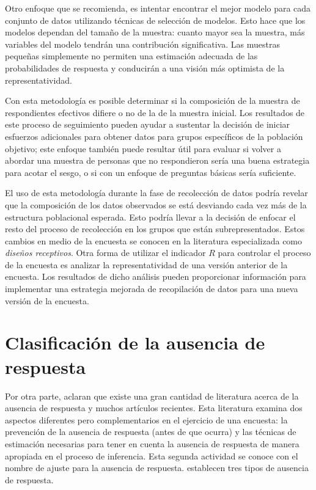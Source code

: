 \documentclass[
  12pt,
]{book}
\begin{document}
Otro enfoque que se recomienda, es intentar encontrar el mejor modelo para cada conjunto de datos utilizando técnicas de selección de modelos. Esto hace que los modelos dependan del tamaño de la muestra: cuanto
mayor sea la muestra, más variables del modelo tendrán una contribución significativa. Las muestras pequeñas simplemente no permiten una estimación adecuada de las probabilidades de respuesta y conducirán a una visión más optimista de la representatividad.

Con esta metodología es posible determinar si la composición de la muestra de respondientes efectivos difiere o no de la de la muestra inicial. Los resultados de este proceso de seguimiento pueden ayudar a sustentar
la decisión de iniciar esfuerzos adicionales para obtener datos para grupos específicos de la población objetivo; este enfoque también puede resultar útil para evaluar si volver a abordar una muestra de personas que no respondieron sería una buena estrategia para acotar el sesgo, o si con un enfoque de preguntas básicas sería suficiente.

El uso de esta metodología durante la fase de recolección de datos podría revelar que la composición de los datos observados se está desviando cada vez más de la estructura poblacional esperada. Esto podría llevar a la decisión de enfocar el resto del proceso de recolección en los grupos que están subrepresentados. Estos cambios en medio de la encuesta se conocen en la literatura especializada como \emph{diseños receptivos}. Otra forma de utilizar el indicador \(R\) para controlar el proceso de la encuesta es analizar la representatividad de una versión anterior de la encuesta. Los resultados de dicho análisis pueden proporcionar información para implementar una estrategia mejorada de recopilación de datos para una nueva versión de la encuesta.

\hypertarget{clasificaciuxf3n-de-la-ausencia-de-respuesta}{%
\section{Clasificación de la ausencia de respuesta}\label{clasificaciuxf3n-de-la-ausencia-de-respuesta}}

Por otra parte, \citet{Lund} aclaran que existe una gran cantidad de literatura acerca de la ausencia de respuesta y muchos artículos recientes. Esta literatura examina dos aspectos diferentes pero complementarios en el ejercicio de una encuesta: la prevención de la ausencia de respuesta (antes de que ocurra) y las técnicas de estimación necesarias para tener en cuenta la ausencia de respuesta de manera apropiada en el proceso de inferencia. Esta segunda actividad se conoce con el nombre de ajuste para la ausencia de respuesta. \citet{LR2002} establecen tres tipos de ausencia de respuesta.
\end{document}
